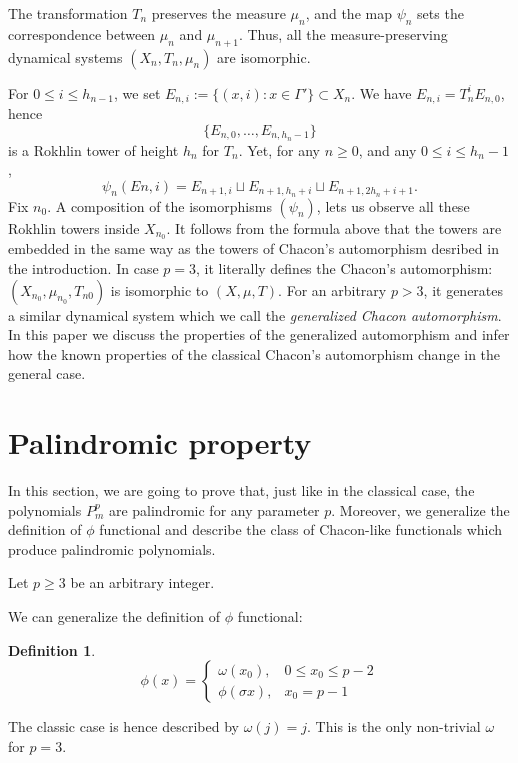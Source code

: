 \documentclass[a4paper]{article}
\theoremstyle{plain}
\theoremstyle{definition}
\newtheorem{definition}{Definition}
\begin{document}
The transformation $T_n$ preserves the measure $\mu_n$, and the map $\psi_n$ sets the correspondence between $\mu_n$ and $\mu_{n+1}$. Thus, all the measure-preserving dynamical systems $(X_n, T_n, \mu_n)$ are isomorphic.

For $ 0 \le i \le h_{n-1}$, we set
$E_{n,i} := \{(x, i) : x \in \Gamma'\} \subset X_n$. We have $E_{n,i} = T^i_n E_{n,0}$, hence
 $$\{E_{n,0},\ldots,E_{n,h_n-1}\}$$
is a Rokhlin tower of height $h_n$ for $T_n$. Yet, for any $n \ge 0$, and any $0 \le i \le
h_n-1$,
$$\psi_n(En,i) = E_{n+1,i} \sqcup E_{n+1,h_n+i} \sqcup E_{n+1,2h_n+i+1}.$$
Fix $n_0$. A composition of the isomorphisms $(\psi_n)$, lets us observe all these Rokhlin
towers inside $X_{n_0}$. It follows from the formula above that the towers are embedded in the
same way as the towers of Chacon’s automorphism desribed in the introduction. In case $p=3$, it literally defines the Chacon's automorphism: $(X_{n_0} , \mu_{n_0} , T_{n0})$ is isomorphic to $(X,\mu,T)$. For an arbitrary $p > 3$, it generates a similar dynamical system which we call the \emph{generalized Chacon automorphism}. In this paper we discuss the properties of the generalized automorphism and infer how the known properties of the classical Chacon's automorphism change in the general case.

\section{Palindromic property}\label{palindromic}
In this section, we are going to prove that, just like in the classical case, the polynomials $P_m^p$ are palindromic for any parameter $p$. Moreover, we generalize the definition of $\phi$ functional and describe the class of Chacon-like functionals which produce palindromic polynomials.

Let $p \ge 3$ be an arbitrary integer.

We can generalize the definition of $\phi$ functional:
\begin{definition}
    $$
    \phi(x) = \begin{cases}
                    \omega(x_0), & 0 \le x_0 \le p - 2 \\
                    \phi(\sigma x), & x_0 = p - 1
                \end{cases}
    $$
\end{definition}
    The classic case is hence described by $\omega(j)=j$. This is the only non-trivial $\omega$ for $p=3$. \\
    
\end{document}
